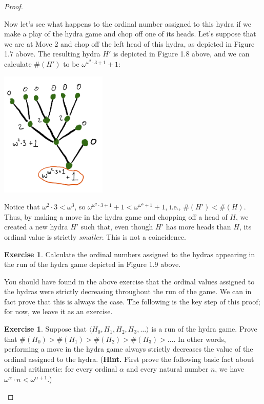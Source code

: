 \documentclass[a4paper]{memoir}
\theoremstyle{definition}
\newtheorem{exercise}[theorem]{Exercise}
\begin{document}
\begin{proof}
\begin{center}
  \end{center}
  Now let's see what happens to the ordinal number assigned to this hydra if we make a play 
  of the hydra game and chop off one of its heads. Let's suppose that we are at Move 2 and 
  chop off the left head of this hydra, as depicted in Figure 1.7 above. The resulting 
  hydra $H'$ is depicted in Figure 1.8 above, and we can calculate $\#(H')$ to be 
  $\omega^{\omega^2 \cdot 3 + 1} + 1$:
  \begin{center}
    \includegraphics[width=2in]{Hydra8}
  \end{center}
  
  Notice that $\omega^2 \cdot 3 < \omega^3$, so $\omega^{\omega^2 \cdot 3 + 1} + 1 < 
  \omega^{\omega^3 + 1} + 1$, i.e., $\#(H') < \#(H)$. Thus, by making a move in the hydra game and 
  chopping off a head of $H$, we created a new hydra $H'$ such that, even though $H'$ has more heads 
  than $H$, its ordinal value is strictly \emph{smaller}. This is not a coincidence.
  
  \begin{exercise}
    Calculate the ordinal numbers assigned to the hydras appearing in the run of the hydra game 
    depicted in Figure 1.9 above.
  \end{exercise}
  
  You should have found in the above exercise that the ordinal values assigned to the hydras 
  were strictly decreasing throughout the run of the game. We can in fact prove that this is 
  always the case. The following is the key step of this proof; for now, we leave it as an exercise.
  
  \begin{exercise}
    Suppose that $\langle H_0, H_1, H_2, H_3, \ldots \rangle$ is a run of the hydra game. Prove 
    that $\#(H_0) > \#(H_1) > \#(H_2) > \#(H_3) > \ldots$. In other words, performing a move in the 
    hydra game always strictly decreases the value of the ordinal assigned to the hydra. 
    (\textbf{Hint.} First prove the following basic fact about ordinal arithmetic: for every 
    ordinal $\alpha$ and every natural number $n$, we have $\omega^{\alpha} \cdot n < 
    \omega^{\alpha + 1}$.)
  \end{exercise}
  

\end{proof}
\end{document}
